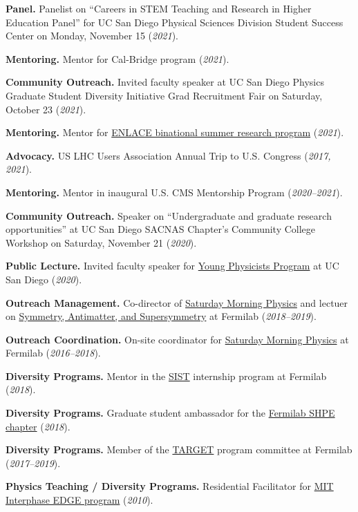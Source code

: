 \documentclass[11pt]{res}
\begin{document}
\begin{resume}
  \textbf{Panel.} Panelist on ``Careers in STEM Teaching and Research in Higher Education Panel'' for UC San Diego Physical Sciences Division Student Success Center on Monday, November 15 (\textit{2021}).

  \textbf{Mentoring.} Mentor for Cal-Bridge program (\textit{2021}).

  \textbf{Community Outreach.} Invited faculty speaker at UC San Diego Physics Graduate Student Diversity Initiative Grad Recruitment Fair on Saturday, October 23 (\textit{2021}).

  \textbf{Mentoring.} Mentor for \href{http://resilientmaterials.ucsd.edu/ENLACE}{ENLACE binational summer research program} (\textit{2021}).

  \textbf{Advocacy.} US LHC Users Association Annual Trip to U.S. Congress (\textit{2017, 2021}).

  \textbf{Mentoring.} Mentor in inaugural U.S. CMS Mentorship Program (\textit{2020--2021}).

  \textbf{Community Outreach.} Speaker on ``Undergraduate and graduate research opportunities'' at UC San Diego SACNAS Chapter's Community College Workshop on Saturday, November 21 (\textit{2020}).

  \textbf{Public Lecture.} Invited faculty speaker for \href{http://ypp.ucsd.edu/}{Young Physicists Program} at UC San Diego (\textit{2020}).

  \textbf{Outreach Management.} Co-director of \href{http://saturdaymorningphysics.fnal.gov/}{Saturday
    Morning Physics} and lectuer on \href{http://saturdaymorningphysics.fnal.gov/fall-session-2018/}{Symmetry, Antimatter, and Supersymmetry} at Fermilab (\textit{2018--2019}).

  \textbf{Outreach Coordination.} On-site coordinator for \href{http://saturdaymorningphysics.fnal.gov/}{Saturday Morning Physics} at Fermilab (\textit{2016--2018}).

  \textbf{Diversity Programs.} Mentor in the \href{http://diversity.fnal.gov/sist/}{SIST} internship program at Fermilab (\textit{2018}).

  \textbf{Diversity Programs.} Graduate student ambassador for the \href{http://diversity.fnal.gov/fshpe/}{Fermilab SHPE chapter} (\textit{2018}).

  \textbf{Diversity Programs.} Member of the \href{http://diversity.fnal.gov/target/}{TARGET} program committee at Fermilab (\textit{2017--2019}).

  \textbf{Physics Teaching / Diversity Programs.} Residential Facilitator for \href{http://ome.mit.edu/programs-services/program-overview}{MIT Interphase EDGE program} (\textit{2010}).


\end{resume}
\end{document}
